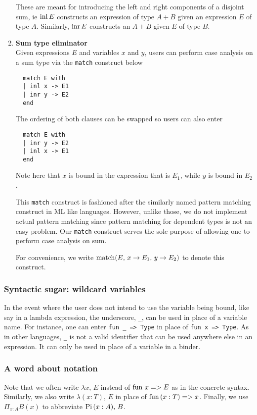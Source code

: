\documentclass{article}
\begin{document}
\begin{enumerate}
These are meant for introducing the left and right components of a disjoint sum,
ie $\operatorname{inl} E$ constructs an expression of type $A + B$ given an expression $E$ of
type $A$. Similarly, $\operatorname{inr} E$ constructs an $A + B$ given $E$ of type $B$.

\item \textbf{Sum type eliminator} \\
Given expressions $E$ and variables $x$ and $y$, users can perform case analysis
on a sum type via the \verb|match| construct below

\begin{verbatim}
  match E with
  | inl x -> E1
  | inr y -> E2
  end
\end{verbatim}

The ordering of both clauses can be swapped so users can also enter
\begin{verbatim}
  match E with
  | inr y -> E2
  | inl x -> E1
  end
\end{verbatim}

Note here that $x$ is bound in the expression that is $E_1$, while $y$ is bound
in $E_2$.

This \verb|match| construct is fashioned after the similarly named pattern
matching construct in ML like languages.
However, unlike those, we do not implement actual pattern matching since pattern
matching for dependent types is not an easy problem.
Our \verb|match| construct serves the sole purpose of allowing one to perform
case analysis on sum.

For convenience, we write 
$\operatorname{match}(E, \, x \rightarrow E_1, \, y \rightarrow E_2)$ to denote this
construct.

\end{enumerate}

\subsubsection{Syntactic sugar: wildcard variables}
In the event where the user does not intend to use the variable being bound,
like say in a lambda expression, the underscore, \verb|_|, can be used in place
of a variable name.
For instance, one can enter \verb|fun _ => Type| in place of \verb|fun x => Type|.
As in other languages, \verb|_| is not a valid identifier that can be used
anywhere else in an expression. It can only be used in place of a variable in a
binder.

\subsubsection{A word about notation}
Note that we often write $\lambda x, \, E$ instead of $\operatorname{fun} \, x => E$ as in the
concrete syntax. Similarly, we also write $\lambda (x : T), \, E$ in place of
$\operatorname{fun} \, (x : T) => x$.
Finally, we use $\Pi_{x : A}B(x)$ to abbreviate $\operatorname{Pi} \, (x : A), \, B$.
\end{document}
